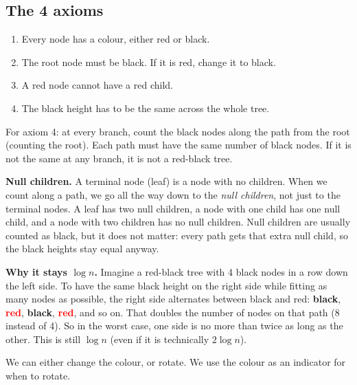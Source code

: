 \documentclass[11pt]{article}
\newcommand{\rd}[1]{\textcolor{Red}{\textbf{#1}}}   %
\newcommand{\bk}[1]{\textbf{#1}}                    %
\begin{document}
	\subsection{The 4 axioms}
	\begin{enumerate}
		\item Every node has a colour, either red or black.
		\item The root node must be black. If it is red, change it to black.
		\item A red node cannot have a red child.
		\item The black height has to be the same across the whole tree.
	\end{enumerate}
	For axiom 4: at every branch, count the black nodes along the path from the root (counting the root). Each path must have the same number of black nodes. If it is not the same at any branch, it is not a red-black tree.
	
	\textbf{Null children.} A terminal node (leaf) is a node with no children. When we count along a path, we go all the way down to the \emph{null children}, not just to the terminal nodes. A leaf has two null children, a node with one child has one null child, and a node with two children has no null children. Null children are usually counted as black, but it does not matter: every path gets that extra null child, so the black heights stay equal anyway.
	
	\textbf{Why it stays $\log n$.} Imagine a red-black tree with 4 black nodes in a row down the left side. To have the same black height on the right side while fitting as many nodes as possible, the right side alternates between black and red: \bk{black}, \rd{red}, \bk{black}, \rd{red}, and so on. That doubles the number of nodes on that path (8 instead of 4). So in the worst case, one side is no more than twice as long as the other. This is still $\log n$ (even if it is technically $2\log n$).
	
	We can either change the colour, or rotate. We use the colour as an indicator for when to rotate.
	
\end{document}
